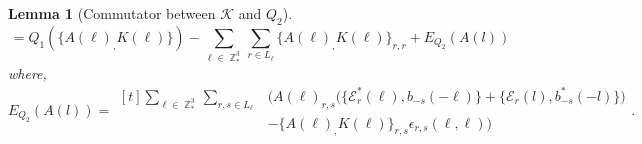 \documentclass[sn-mathphys,Numbered, a4paper ,nocrop]{sn-jnl}%
\DeclareMathOperator{\Z}{\mathbb{Z}}
\theoremstyle{plain}
\newtheorem{lemma}[theorem]{Lemma}
\theoremstyle{definition}
\theoremstyle{remark}
\theoremstyle{plain}
\theoremstyle{definition}
\theoremstyle{remark}
\begin{document}
\begin{lemma}[Commutator between $\mathcal{K} $ and $Q_2$]
\begin{equation}
    [ Q_2(A(\ell)),\mathcal{K}] = Q_1\left(\Big\{A(\ell)_
        ,K(\ell)\Big\}\right)-\sum\limits_{\ell \in \Z^3_*}\sum\limits_{r \in L_{\ell}}\Big\{A(\ell)_
        ,K(\ell)\Big\}_{r,r} + E_{Q_2}(A(l)) 
\end{equation}
 where,
\begin{equation}
    E_{Q_2}(A(l)) =\begin{aligned}[t]
        \sum\limits_{\ell \in \Z^3_*}\sum\limits_{r,s \in L_{\ell}}&\Big(A(\ell)_{r,s}\big(\big\{\mathcal{E}^*_{r}(\ell), b_{-s}(-\ell)\big\} + \big\{\mathcal{E}_r(l), b^*_{-s}(-l)\big\}\big)\\&-\big\{A(\ell)_,K(\ell)\big\}_{r,s}\epsilon_{r,s}(\ell,\ell)\Big)
    \end{aligned} .  
\end{equation}
\end{lemma}
\end{document}
